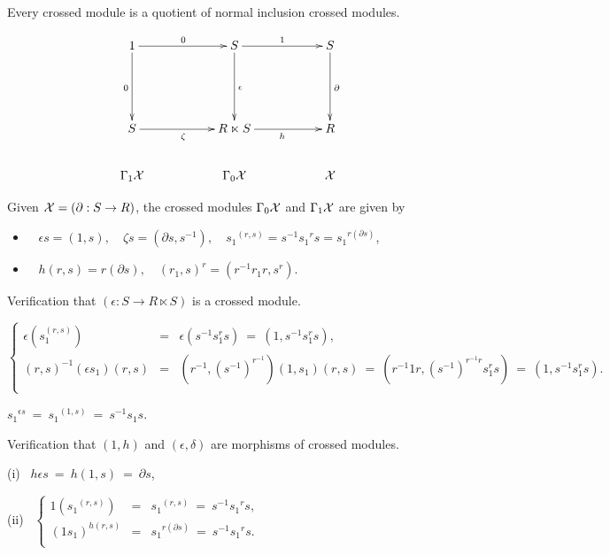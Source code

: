 \newpage
\begin{thm}
\mbox{}\\
Every crossed module is a quotient of normal inclusion crossed modules.
\end{thm}
\begin{pf}
\begin{equation} \label{eq:tp-quotient}
\vcenter{\xy
\xymatrix{
    1 \ar[dd]_{0}  \ar[rr]^{0}
    &&    S  \ar[rr]^{1} 
             \ar[dd]^{\epsilon} 
      &&  S  \ar[dd]^{\partial}  \\
    &&&& \\
    S \ar[rr]_{\zeta}
    &&    R \ltimes S  \ar[rr]_{h}
      &&  R \\
    \Gamma_1\calX && \Gamma_0\calX && \calX \\ 
}
\endxy} 
\end{equation}

\bigskip
Given  $\mathcal{X} = (\partial : S \to R)$, the crossed modules
$\Gamma_0\mathcal{X}$ and $\Gamma_1\mathcal{X}$  are given by
\begin{itemize}
\item~ 
$\epsilon s = (1,s), \quad 
\zeta s = (\partial s, s^{-1}), \quad
{s_1}^{(r,s)} = s^{-1} {s_1}^r s = {s_1}^{r(\partial s)}$,
\item~ 
$h(r,s) = r(\partial s), \quad
(r_1,s)^r = (r^{-1}r_1r, s^r)$.
\end{itemize}

\bigskip\noindent
Verification that $(\epsilon : S \to R \ltimes S)$ is a crossed module.

\bigskip{}\quad
$\left\{ 
\begin{array}{rcl}
\epsilon(s_1^{(r,s)}) & = & 
\epsilon(s^{-1}s_1^rs) ~=~ (1,s^{-1}s_1^rs), \\
(r,s)^{-1}(\epsilon s_1)(r,s) & = &
(r^{-1},(s^{-1})^{r^{-1}})(1,s_1)(r,s) ~=~ 
(r^{-1}1r, (s^{-1})^{r^{-1}r}s_1^rs) ~=~ (1,s^{-1}s_1^rs). \\
\end{array}\right.$

\bigskip{}\quad
${s_1}^{\epsilon s} ~=~ {s_1}^{(1,s)} ~=~ s^{-1}s_1s.$

\bigskip\noindent
Verification that $(1,h)$ and $(\epsilon,\delta)$ 
are morphisms of crossed modules.

\bigskip
(i)~ $h \epsilon s ~=~ h(1,s) ~=~ \partial s$,

\bigskip
(ii)~ 
$\left\{ 
\begin{array}{rcl}
1({s_1}^{(r,s)}) & = & 
{s_1}^{(r,s)} ~=~ s^{-1}{s_1}^rs, \\
(1s_1)^{h(r,s)} & = &
{s_1}^{r(\partial s)} ~=~ 
s^{-1}{s_1}^rs. \\
\end{array}\right.$


\end{pf}
